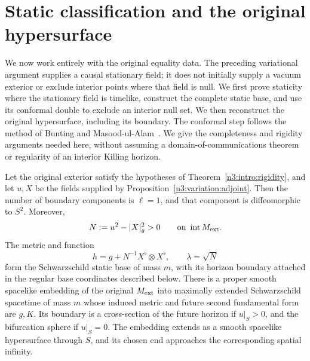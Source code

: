 \section{Static classification and the original hypersurface}
\label{n3:static:section}

We now work entirely with the original equality data.
The preceding variational argument supplies a causal stationary field;
it does not initially supply a vacuum exterior or exclude interior points
where that field is null.
We first prove staticity where the stationary field is timelike, construct
the complete static base, and use its conformal double to exclude an
interior null set. We then reconstruct the original hypersurface,
including its boundary.
The conformal step follows the method of
Bunting and Masood-ul-Alam~\cite{BuntingMasoodUlAlam1987}.
We give the completeness and rigidity arguments needed here, without
assuming a domain-of-communications theorem or regularity of an interior
Killing horizon.

\begin{proposition}
\label{n3:static:classification}
Let the original exterior satisfy the hypotheses of
Theorem~\ref{n3:intro:rigidity}, and let \(u,X\) be the fields supplied by
Proposition~\ref{n3:variation:adjoint}.
Then the number of boundary components is $\ell=1$, and that
component is diffeomorphic to $S^2$. Moreover,
\[
N:=u^2-|X|_g^2>0
\qquad\text{on }\operatorname{int}M_{\mathrm{ext}}.
\]
The metric and function
\[
h=g+N^{-1}X^\flat\otimes X^\flat,\qquad \lambda=\sqrt N
\]
form the Schwarzschild static base of mass \(m\), with its horizon
boundary attached in the regular base coordinates described below.
There is a proper smooth spacelike embedding of the original
\(M_{\mathrm{ext}}\) into maximally extended Schwarzschild spacetime of mass \(m\)
whose induced metric and future second fundamental form are \(g,K\).
Its boundary is a cross-section of the future horizon if \(u|_S>0\),
and the bifurcation sphere if \(u|_S=0\).
The embedding extends as a smooth spacelike hypersurface through \(S\),
and its chosen end approaches the corresponding spatial infinity.
\end{proposition}

